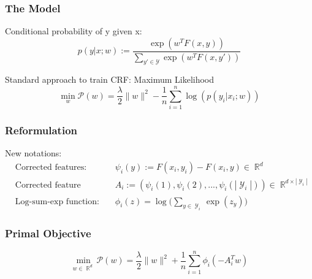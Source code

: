 \documentclass{beamer}
\DeclareMathOperator{\R}{\mathbb{R}}
\DeclareMathOperator{\1}{\mathbb{1}}
\DeclareMathOperator{\Y}{\mathcal{Y}}
\begin{document}
\begin{frame}
\frametitle{The Model}

Conditional probability of y given x:
\begin{equation*}
	\label{primal probability}
	p(y | x ; w) := \frac{\exp(w^TF(x, y))}{\sum_{y' \in \mathcal{Y}} \exp(w^TF(x, y'))}
\end{equation*}

Standard approach to train CRF: Maximum Likelihood
\begin{equation*}
	\min_w \mathscr P(w)  = \frac{\lambda}{2}\|w\|^2 - \frac{1}{n}   \sum_{i=1}^{n} \log(p(y_i|x_i; w))
\end{equation*}

\end{frame}
\begin{frame}
\frametitle{Reformulation}

New notations:
\begin{align*}
	&\textrm{Corrected features:} & \psi_i(y) := F(x_i, y_i) - F(x_i, y) \in \R^d \\
	&\textrm{Corrected feature matrix:} & A_i := ( \psi_i(1),\psi_i(2),...,\psi_i(|\Y_i|) ) \in \R^{d\times |\Y_i|} \\
	&\textrm{Log-sum-exp function:} & \phi_i(z) = \log \big(\sum_{y\in \Y_i} \exp(z_y)\big)
\end{align*}

\end{frame}
\begin{frame}
\frametitle{Primal Objective}

\begin{equation}
	\min_{w\in\R^d}  \mathscr P(w) = \frac{\lambda}{2}\|w\|^2 + \frac{1}{n}   \sum_{i=1}^{n} \phi_i(-A_i^Tw)
\end{equation}

\end{frame}
\end{document}
